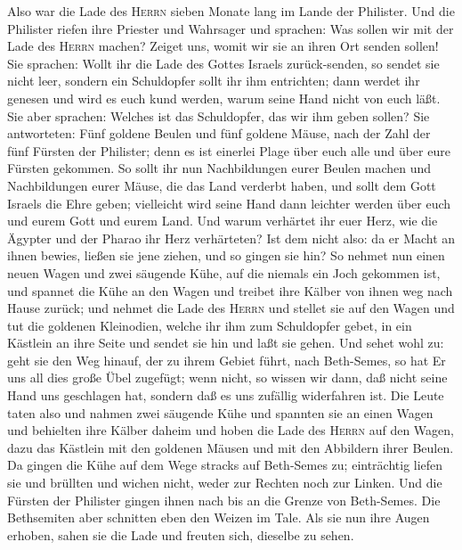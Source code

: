  Also war die Lade des \textsc{Herrn} sieben Monate lang
im Lande der Philister.  Und die Philister riefen ihre
Priester und Wahrsager und sprachen: Was sollen wir mit der Lade des
\textsc{Herrn} machen? Zeiget uns, womit wir sie an ihren Ort senden
sollen!  Sie sprachen: Wollt ihr die Lade des Gottes
Israels zurück-senden, so sendet sie nicht leer, sondern ein Schuldopfer
sollt ihr ihm entrichten; dann werdet ihr genesen und wird es euch kund
werden, warum seine Hand nicht von euch läßt.  Sie aber
sprachen: Welches ist das Schuldopfer, das wir ihm geben sollen? Sie
antworteten: Fünf goldene Beulen und fünf goldene Mäuse, nach der Zahl
der fünf Fürsten der Philister; denn es ist einerlei Plage über euch
alle und über eure Fürsten gekommen.  So sollt ihr nun
Nachbildungen eurer Beulen machen und Nachbildungen eurer Mäuse, die das
Land verderbt haben, und sollt dem Gott Israels die Ehre geben;
vielleicht wird seine Hand dann leichter werden über euch und eurem Gott
und eurem Land.  Und warum verhärtet ihr euer Herz, wie
die Ägypter und der Pharao ihr Herz verhärteten? Ist dem nicht also: da
er Macht an ihnen bewies, ließen sie jene ziehen, und so gingen sie hin?
 So nehmet nun einen neuen Wagen und zwei säugende Kühe,
auf die niemals ein Joch gekommen ist, und spannet die Kühe an den Wagen
und treibet ihre Kälber von ihnen weg nach Hause zurück; 
und nehmet die Lade des \textsc{Herrn} und stellet sie auf den Wagen und
tut die goldenen Kleinodien, welche ihr ihm zum Schuldopfer gebet, in
ein Kästlein an ihre Seite und sendet sie hin und laßt sie gehen.
 Und sehet wohl zu: geht sie den Weg hinauf, der zu ihrem
Gebiet führt, nach Beth-Semes, so hat Er uns all dies große Übel
zugefügt; wenn nicht, so wissen wir dann, daß nicht seine Hand uns
geschlagen hat, sondern daß es uns zufällig widerfahren ist.
 Die Leute taten also und nahmen zwei säugende Kühe und
spannten sie an einen Wagen und behielten ihre Kälber daheim
 und hoben die Lade des \textsc{Herrn} auf den Wagen,
dazu das Kästlein mit den goldenen Mäusen und mit den Abbildern ihrer
Beulen.  Da gingen die Kühe auf dem Wege stracks auf
Beth-Semes zu; einträchtig liefen sie und brüllten und wichen nicht,
weder zur Rechten noch zur Linken. Und die Fürsten der Philister gingen
ihnen nach bis an die Grenze von Beth-Semes.  Die
Bethsemiten aber schnitten eben den Weizen im Tale. Als sie nun ihre
Augen erhoben, sahen sie die Lade und freuten sich, dieselbe zu sehen.
